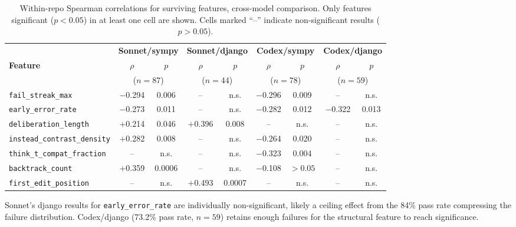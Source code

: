 \documentclass[11pt]{article}
\newcommand{\feat}[1]{\texttt{#1}}
\begin{document}
\begin{table}[t]
\centering
\caption{Within-repo Spearman correlations for surviving features, cross-model comparison. Only features significant ($p < 0.05$) in at least one cell are shown. Cells marked ``--'' indicate non-significant results ($p > 0.05$).}
\label{tab:spearman}
\small
\begin{adjustbox}{max width=\textwidth}
\setlength{\tabcolsep}{3pt}
\begin{tabular}{lcccccccc}
\toprule
 & \multicolumn{2}{c}{\textbf{Sonnet/sympy}} & \multicolumn{2}{c}{\textbf{Sonnet/django}} & \multicolumn{2}{c}{\textbf{Codex/sympy}} & \multicolumn{2}{c}{\textbf{Codex/django}} \\
\cmidrule(lr){2-3}\cmidrule(lr){4-5}\cmidrule(lr){6-7}\cmidrule(lr){8-9}
\textbf{Feature} & $\rho$ & $p$ & $\rho$ & $p$ & $\rho$ & $p$ & $\rho$ & $p$ \\
 & \multicolumn{2}{c}{($n{=}87$)} & \multicolumn{2}{c}{($n{=}44$)} & \multicolumn{2}{c}{($n{=}78$)} & \multicolumn{2}{c}{($n{=}59$)} \\
\midrule
\feat{fail\_streak\_max}           & $-$0.294 & 0.006 & -- & n.s. & $-$0.296 & 0.009 & -- & n.s. \\
\feat{early\_error\_rate}          & $-$0.273 & 0.011 & -- & n.s. & $-$0.282 & 0.012 & $-$0.322 & 0.013 \\
\feat{deliberation\_length}        & $+$0.214 & 0.046 & $+$0.396 & 0.008 & -- & n.s. & -- & n.s. \\
\feat{instead\_contrast\_density}  & $+$0.282 & 0.008 & -- & n.s. & $-$0.264 & 0.020 & -- & n.s. \\
\feat{think\_t\_compat\_fraction}  & -- & n.s. & -- & n.s. & $-$0.323 & 0.004 & -- & n.s. \\
\feat{backtrack\_count}            & $+$0.359 & 0.0006 & -- & n.s. & $-$0.108 & ${>}0.05$ & -- & n.s. \\
\feat{first\_edit\_position}       & -- & n.s. & $+$0.493 & 0.0007 & -- & n.s. & -- & n.s. \\
\bottomrule
\end{tabular}
\end{adjustbox}
\end{table}

Sonnet's django results for \feat{early\_error\_rate} are individually non-significant, likely a ceiling effect from the 84\% pass rate compressing the failure distribution.
Codex/django (73.2\% pass rate, $n = 59$) retains enough failures for the structural feature to reach significance.
\end{document}
